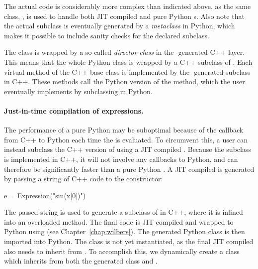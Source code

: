 
The actual code is considerably more complex than indicated above, as
the same class, , is used to handle both JIT compiled
and pure Python s. Also note that the actual subclass
is eventually generated by a \emph{metaclass} in Python, which makes it
possible to include sanity checks for the declared subclass.

The  class is wrapped by a so-called \emph{director class} in
the \swig-generated C++ layer. This means that the whole Python class is
wrapped by a C++ subclass of . Each virtual method
of the C++ base class is implemented by the \swig-generated subclass in
C++. These methods call the Python version of the method, which the user
eventually implements by subclassing  in Python.

\paragraph{Just-in-time compilation of expressions.}

The performance of a pure Python  may be suboptimal
because of the callback from C++ to Python each time the 
is evaluated. To circumvent this, a user can instead subclass the C++
version of  using a JIT compiled . Because
the subclass is implemented in C++, it will not involve any callbacks
to Python, and can therefore be significantly faster than a pure Python
. A JIT compiled  is generated by passing
a string of C++ code to the  constructor:
\begin{python}
e = Expression("sin(x[0])")
\end{python}
The passed string is used to generate a subclass of
 in C++, where it is inlined into an overloaded
 method. The final code is JIT compiled and wrapped to Python
using \instant (see Chapter~\ref{chap:wilbers}). The generated Python
class is then imported into Python. The class is not yet instantiated,
as the final JIT compiled  also needs to inherit from
. To accomplish this, we dynamically create a class
which inherits from both the generated class and .

